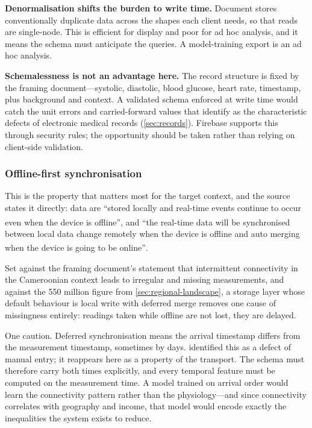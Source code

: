 \documentclass[12pt,a4paper,oneside]{report}
\newcommand{\bq}[1]{``#1''\textsuperscript{\dag}}
\begin{document}
\textbf{Denormalisation shifts the burden to write time.} Document stores conventionally duplicate data across the shapes each client needs, so that reads are single-node. This is efficient for display and poor for ad hoc analysis, and it means the schema must anticipate the queries. A model-training export is an ad hoc analysis.

\textbf{Schemalessness is not an advantage here.} The record structure is fixed by the framing document---systolic, diastolic, blood glucose, heart rate, timestamp, plus background and context. A validated schema enforced at write time would catch the unit errors and carried-forward values that \textcite{liu2025review} identify as the characteristic defects of electronic medical records (\cref{sec:records}). Firebase supports this through security rules; the opportunity should be taken rather than relying on client-side validation.

\subsubsection{Offline-first synchronisation}\label{sec:offline}

This is the property that matters most for the target context, and the source states it directly: data are \bq{stored locally and real-time events continue to occur even when the device is offline}, and \bq{the real-time data will be synchronised between local data change remotely when the device is offline and auto merging when the device is going to be online}.

Set against the framing document's statement that intermittent connectivity in the Cameroonian context leads to irregular and missing measurements, and against the 550 million figure from \cref{sec:regional-landscape}, a storage layer whose default behaviour is local write with deferred merge removes one cause of missingness entirely: readings taken while offline are not lost, they are delayed.

One caution. Deferred synchronisation means the arrival timestamp differs from the measurement timestamp, sometimes by days.  identified this as a defect of manual entry; it reappears here as a property of the transport. The schema must therefore carry both times explicitly, and every temporal feature must be computed on the measurement time. A model trained on arrival order would learn the connectivity pattern rather than the physiology---and since connectivity correlates with geography and income, that model would encode exactly the inequalities the system exists to reduce.
\end{document}

